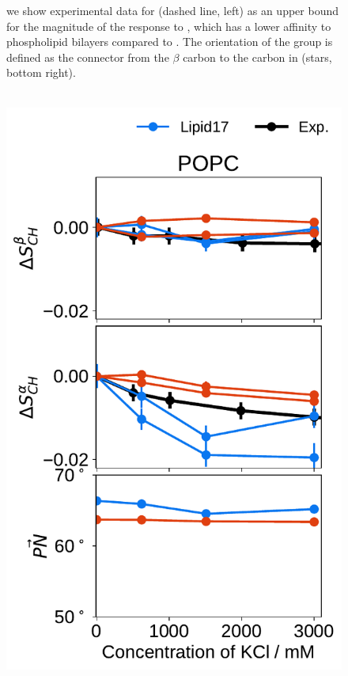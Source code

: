 \documentclass[journal=jpcbfk,manuscript=article]{achemso}
\newlength{\figheight}
\begin{document}
\begin{figure}[tbp!]
{    we show experimental data for  (dashed line, left) 
    as an upper bound for the magnitude of the response to , 
    which has a lower affinity to phospholipid bilayers compared to  \citep{roux90}. 
    The orientation of the  group is defined as 
    the connector from the $\beta$ carbon to the carbon in  (stars, bottom right). 
  }
   \\
   \\
  \end{figure} 


\begin{figure}[tbp!] 
  \centering 
  \includegraphics[height=\figheight]{../img/ecc_pops/order_parameters_changes_ecc-lip_L14_A-B-PN-COO_POPC_kcl.pdf} 

\end{figure}
\end{document}
